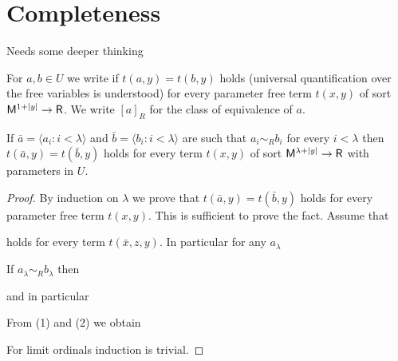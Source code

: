 \documentclass[11pt,oneside]{amsart}
\renewcommand*{\emph}[1]{%
   \smash{\tikz[baseline]\node[rectangle, fill=teal!25, rounded corners, inner xsep=0.5ex, inner ysep=0.2ex, anchor=base, minimum height = 2.7ex]{#1};}}
\begin{document}
\section{Completeness}

Needs some deeper thinking

For $a,b\in U$ we write \emph{$a\sim_{\!R} b$\/} if $t(a,y)=t(b,y)$ holds (universal quantification over the free variables is understood) for every parameter free term $t(x,y)$ of sort ${\sf M}^{1+|y|}\to {\sf R}$.
We write $[a]_{\!R}$ for the class of equivalence of $a$.

\begin{fact}
  If $\bar a=\langle a_i:i<\lambda\rangle$ and $\bar b=\langle b_i:i<\lambda\rangle$ are such that $a_i\sim_{\!R} b_i$ for every $i<\lambda$ then $t(\bar a,y)=t(\bar b,y)$ holds for every term $t(x,y)$ of sort ${\sf M}^{\lambda+|y|}\to {\sf R}$ with parameters in $U$.
\end{fact}

\begin{proof}
  By induction on $\lambda$ we prove that $t(\bar a,y)=t(\bar b,y)$ holds for every parameter free term $t(x,y)$.
  This is sufficient to prove the fact.
  Assume that
  

  holds for every term $t(\bar x,z,y)$.   
  In particular for any $a_\lambda$


  If $a_\lambda\sim_{\!R} b_\lambda$ then


  and in particular 


  From (1) and (2) we obtain


  For limit ordinals induction is trivial.
\end{proof}

\end{document}
